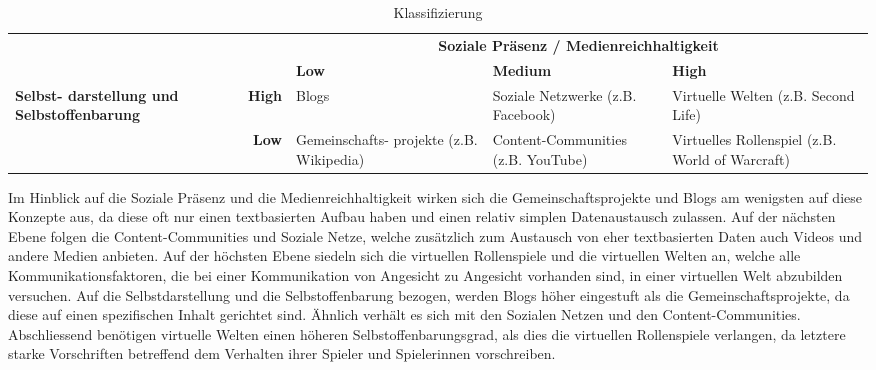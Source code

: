 \begin{table}[ht] \centering
	\caption{Klassifizierung}
	\begin{tabular}[t]{|m{27mm} r|m{28mm}|m{28mm}|m{35mm}|} \hline 
		\multicolumn{2}{|c|}{} & \multicolumn{3}{c|}{\textbf{Soziale Präsenz / Medienreichhaltigkeit}} \\
		\multicolumn{2}{|c|}{} & \cellcolor{gray} \textbf{Low} & \cellcolor{gray} \textbf{Medium} & \cellcolor{gray} \textbf{High} \\ 
			\hline 
		\multirow{2}{27mm}{\textbf{Selbst- darstellung und Selbstoffenbarung}} & \cellcolor{gray}\textbf{High} & Blogs & Soziale Netzwerke (z.B. Facebook) & Virtuelle Welten (z.B. Second Life) \\ 
			\cline{2-5}
		& \cellcolor{gray}\textbf{Low} & Gemeinschafts- projekte (z.B. Wikipedia) & Content-Communities (z.B. YouTube) & Virtuelles Rollenspiel (z.B. World of Warcraft) \\ 
			\hline
	\end{tabular}
	\label{tab:Klassifiaktion}
\end{table}
 
Im Hinblick auf die Soziale Präsenz und die Medienreichhaltigkeit wirken sich die Gemeinschaftsprojekte und Blogs am wenigsten auf diese Konzepte aus, da diese oft nur einen textbasierten Aufbau haben und einen relativ simplen Datenaustausch zulassen. Auf der nächsten Ebene folgen die Content-Communities und Soziale Netze, welche zusätzlich zum Austausch von eher textbasierten Daten auch Videos und andere Medien anbieten. Auf der höchsten Ebene siedeln sich die virtuellen Rollenspiele und die virtuellen Welten an, welche alle Kommunikationsfaktoren, die bei einer Kommunikation von Angesicht zu Angesicht vorhanden sind, in einer virtuellen Welt abzubilden versuchen. \newline 
Auf die Selbstdarstellung und die Selbstoffenbarung bezogen, werden Blogs höher eingestuft als die Gemeinschaftsprojekte, da diese auf einen spezifischen Inhalt gerichtet sind. Ähnlich verhält es sich mit den Sozialen Netzen und den Content-Communities. Abschliessend benötigen virtuelle Welten einen höheren Selbstoffenbarungsgrad, als dies die virtuellen Rollenspiele verlangen, da letztere starke Vorschriften betreffend dem Verhalten ihrer Spieler und Spielerinnen vorschreiben.

